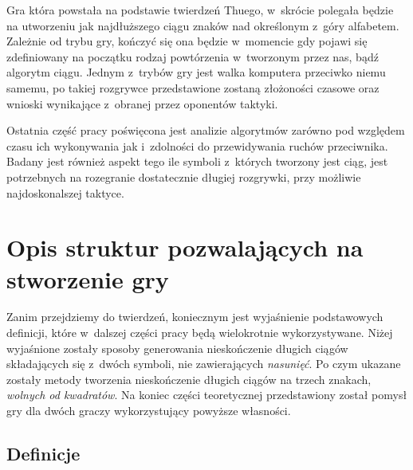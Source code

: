 \documentclass[document]{xmgr}
\begin{document}
Gra która powstała na podstawie twierdzeń Thuego, w~skrócie polegała będzie na utworzeniu jak najdłuższego ciągu znaków nad określonym z~góry alfabetem. Zależnie od trybu gry, kończyć się ona będzie w~momencie gdy pojawi się zdefiniowany na początku rodzaj powtórzenia w~tworzonym przez nas, bądź algorytm ciągu. Jednym z~trybów gry jest walka komputera przeciwko niemu samemu, po takiej rozgrywce przedstawione zostaną złożoności czasowe oraz wnioski wynikające z~obranej przez oponentów taktyki. 

Ostatnia część pracy poświęcona jest analizie algorytmów zarówno pod względem czasu ich wykonywania jak i~zdolności do przewidywania ruchów przeciwnika. Badany jest również aspekt tego ile symboli z~których tworzony jest ciąg, jest potrzebnych na rozegranie dostatecznie długiej rozgrywki, przy możliwie najdoskonalszej taktyce.

\chapter{Opis struktur pozwalających na stworzenie gry}
Zanim przejdziemy do twierdzeń, koniecznym jest wyjaśnienie podstawowych definicji, które w~dalszej części pracy będą wielokrotnie wykorzystywane. Niżej wyjaśnione zostały sposoby generowania nieskończenie długich ciągów składających się z~dwóch symboli, nie zawierających \emph{nasunięć}. Po czym ukazane zostały metody tworzenia nieskończenie długich ciągów na trzech znakach, \emph{wolnych od kwadratów}. Na koniec części teoretycznej przedstawiony został pomysł gry dla dwóch graczy wykorzystujący powyższe własności.


\section{Definicje}
\end{document}
